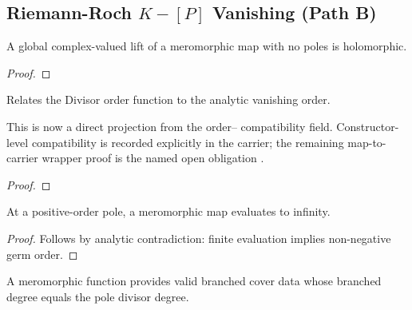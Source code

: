 \subsection{Riemann-Roch \(K-[P]\) Vanishing (Path B)}
\label{sec:rr-k-minus-p-vanishing}

\begin{lemma}
\label{lem:to-finite-fun-mdifferentiable}
A global complex-valued lift of a meromorphic map with no poles is holomorphic.
\end{lemma}

\begin{proof}\leanok\end{proof}

\begin{lemma}
\label{lem:germ-order-bridge}
\leanok
Relates the Divisor order function to the analytic vanishing order.

This is now a direct projection from the
 order-- compatibility
field. Constructor-level compatibility is recorded explicitly in the carrier;
the remaining map-to-carrier wrapper proof is the named open obligation
.
\end{lemma}
\begin{proof}\leanok\end{proof}

\begin{lemma}
\label{lem:to-map-eq-infty-of-pole-divisor-pos}
At a positive-order pole, a meromorphic map evaluates to infinity.
\end{lemma}
\begin{proof}
\leanok
Follows by analytic contradiction: finite evaluation implies non-negative germ order.
\end{proof}

\begin{lemma}
\label{lem:branched-cover-data-of-pole-degree}
A meromorphic function provides valid branched cover data whose branched degree equals the pole divisor degree.
\end{lemma}

